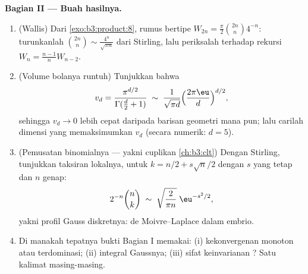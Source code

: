 \begin{problem}
\medskip
\noindent\textbf{Bagian II --- Buah hasilnya.}
\begin{enumerate}[resume]
  \item (Wallis) Dari \cref{exo:b3:product:8}, rumus bertipe $W_{2n} =
        \frac\pi2\binom{2n}n4^{-n}$: turunkanlah
        $\binom{2n}{n} \sim \frac{4^n}{\sqrt{\pi n}}$ dari
        Stirling, lalu periksalah terhadap rekursi $W_{n} =
        \frac{n-1}nW_{n-2}$.
  \item (Volume bolanya runtuh) Tunjukkan bahwa
        \[
        v_d = \frac{\pi^{d/2}}{\Gamma(\frac d2 + 1)}
        \;\sim\; \frac{1}{\sqrt{\pi d}}
        \Bigl(\frac{2\pi\eu}{d}\Bigr)^{d/2},
        \]
        sehingga $v_d \to 0$ lebih cepat daripada barisan geometri mana pun;
        lalu carilah dimensi yang memaksimumkan $v_d$ (secara numerik: $d =
        5$).
  \item (Pemusatan binomialnya --- yakni cuplikan
        \cref{ch:b3:clt}) Dengan Stirling, tunjukkan taksiran
        lokalnya, untuk $k = n/2 + s\sqrt n/2$ dengan $s$ yang tetap
        dan $n$ genap:
        \[
        2^{-n}\binom{n}{k} \;\sim\;
        \sqrt{\frac{2}{\pi n}}\;\eu^{-s^2/2},
        \]
        yakni profil Gauss diskretnya: de Moivre--Laplace dalam
        embrio.
  \item Di manakah tepatnya bukti Bagian I memakai: (i) kekonvergenan monoton atau
        terdominasi; (ii) integral Gaussnya; (iii) sifat keinvarianan
        ? Satu kalimat masing-masing.
\end{enumerate}


\end{problem}
